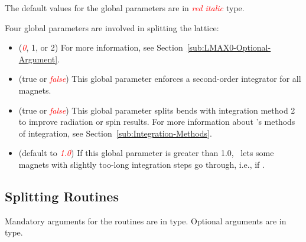 %
The default values for the global parameters are in {\textit{\textcolor{red}{red
italic }}}type.

Four global parameters are involved in splitting the lattice:
\begin{itemize}
  \item {} (\textit{\textcolor{red}{0}}, 1, or 2)
        For more information, see Section~\ref{sub:LMAX0-Optional-Argument}.
  \item {} (true or \textit{\textcolor{red}{false}})
        This global parameter enforces a second-order integrator for all magnets.
  \item {} (true or \textit{\textcolor{red}{false}})
        This global parameter splits bends with integration method 2 to improve
        radiation or spin results. For more information about \PTC's methods of
        integration, see Section~\ref{sub:Integration-Methods}.
  \item {} (default to \textit{\textcolor{red}{1.0}})
        If this global parameter is greater than 1.0, \PTC\ lets some magnets with
        slightly too-long integration steps go through,
        i.e., if .
\end{itemize}


\subsection{Splitting Routines}

%
Mandatory arguments for the routines are in  type.
Optional arguments are in \ptc{\textit{\textcolor{red}{red italic}}} type.


